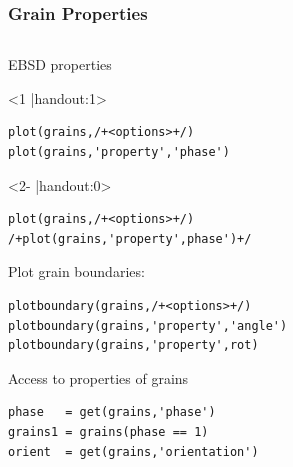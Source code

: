 \begin{frame}[fragile]
  \frametitle{Grain Properties}

  \begin{columns}
    \begin{column}{8.5cm}


      EBSD properties

\begin{onlyenv}<1 |handout:1>
\begin{lstlisting}
plot(grains,/+<options>+/)
plot(grains,'property','phase')
\end{lstlisting}
\end{onlyenv}

\begin{onlyenv}<2- |handout:0>
\begin{lstlisting}
plot(grains,/+<options>+/)
/+plot(grains,'property',phase')+/
\end{lstlisting}
\end{onlyenv}

\pause

Plot grain boundaries:
\begin{lstlisting}
plotboundary(grains,/+<options>+/)
plotboundary(grains,'property','angle')
plotboundary(grains,'property',rot)
\end{lstlisting}

Access to properties of grains
\begin{lstlisting}
phase   = get(grains,'phase')
grains1 = grains(phase == 1)
orient  = get(grains,'orientation')
\end{lstlisting}


\end{column}
\end{columns}
\end{frame}
